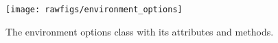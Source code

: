 \begin{figure}[htpb]
\centering
\texttt{[image: rawfigs/environment\_options]}
\vspace*{-1.2cm}
\caption{The environment options class with its attributes and methods.}
\label{fig-env-options-class}
\end{figure}



%


